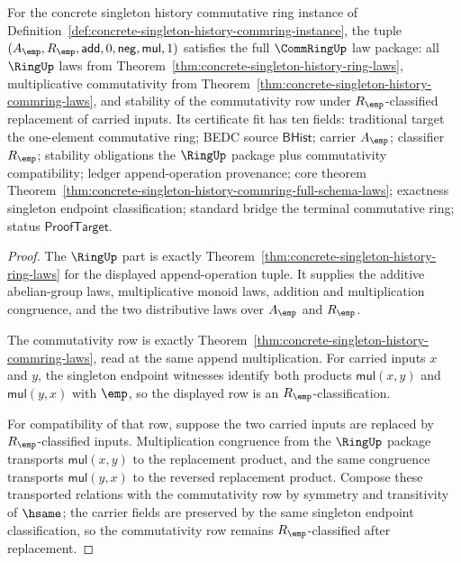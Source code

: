 \begin{theorem}
\label{thm:concrete-singleton-history-commring-full-schema-laws}
For the concrete singleton history commutative ring instance of
Definition~\ref{def:concrete-singleton-history-commring-instance}, the tuple
$(A_{\emp},R_{\emp},\mathsf{add},0,\mathsf{neg},\mathsf{mul},1)$ satisfies
the full $\CommRingUp$ law package: all $\RingUp$ laws from
Theorem~\ref{thm:concrete-singleton-history-ring-laws}, multiplicative
commutativity from
Theorem~\ref{thm:concrete-singleton-history-commring-laws}, and stability of
the commutativity row under $R_{\emp}$-classified replacement of carried
inputs. Its certificate fit has ten fields: traditional target the
one-element commutative ring; BEDC source $\mathsf{BHist}$; carrier
$A_{\emp}$; classifier $R_{\emp}$; stability obligations the $\RingUp$
package plus commutativity compatibility; ledger append-operation provenance;
core theorem Theorem~\ref{thm:concrete-singleton-history-commring-full-schema-laws};
exactness singleton endpoint classification; standard bridge the terminal
commutative ring; status $\mathsf{ProofTarget}$.
\end{theorem}
\begin{proof}
The $\RingUp$ part is exactly
Theorem~\ref{thm:concrete-singleton-history-ring-laws} for the displayed
append-operation tuple. It supplies the additive abelian-group laws,
multiplicative monoid laws, addition and multiplication congruence, and the
two distributive laws over $A_{\emp}$ and $R_{\emp}$.

The commutativity row is exactly
Theorem~\ref{thm:concrete-singleton-history-commring-laws}, read at the same
append multiplication. For carried inputs $x$ and $y$, the singleton endpoint
witnesses identify both products $\mathsf{mul}(x,y)$ and
$\mathsf{mul}(y,x)$ with $\emp$, so the displayed row is an
$R_{\emp}$-classification.

For compatibility of that row, suppose the two carried inputs are replaced by
$R_{\emp}$-classified inputs. Multiplication congruence from the $\RingUp$
package transports $\mathsf{mul}(x,y)$ to the replacement product, and the
same congruence transports $\mathsf{mul}(y,x)$ to the reversed replacement
product. Compose these transported relations with the commutativity row by
symmetry and transitivity of $\hsame$; the carrier fields are preserved by the
same singleton endpoint classification, so the commutativity row remains
$R_{\emp}$-classified after replacement.
\end{proof}

